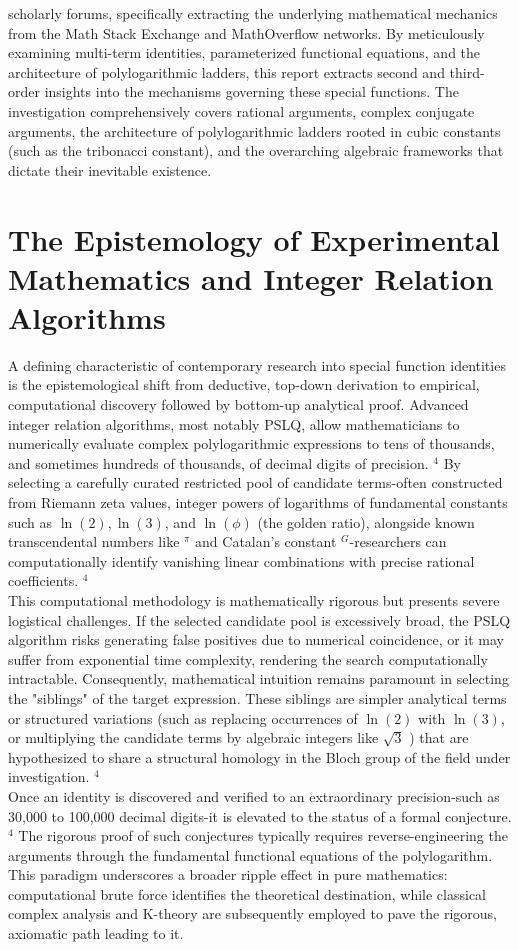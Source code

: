 \documentclass[10pt]{article}
\begin{document}
scholarly forums, specifically extracting the underlying mathematical mechanics from the Math Stack Exchange and MathOverflow networks. By meticulously examining multi-term identities, parameterized functional equations, and the architecture of polylogarithmic ladders, this report extracts second and third-order insights into the mechanisms governing these special functions. The investigation comprehensively covers rational arguments, complex conjugate arguments, the architecture of polylogarithmic ladders rooted in cubic constants (such as the tribonacci constant), and the overarching algebraic frameworks that dictate their inevitable existence.

\section*{The Epistemology of Experimental Mathematics and Integer Relation Algorithms}
A defining characteristic of contemporary research into special function identities is the epistemological shift from deductive, top-down derivation to empirical, computational discovery followed by bottom-up analytical proof. Advanced integer relation algorithms, most notably PSLQ, allow mathematicians to numerically evaluate complex polylogarithmic expressions to tens of thousands, and sometimes hundreds of thousands, of decimal digits of precision. ${ }^{4}$ By selecting a carefully curated restricted pool of candidate terms-often constructed from Riemann zeta values, integer powers of logarithms of fundamental constants such as $\ln (2), \ln (3)$, and $\ln (\phi)$ (the golden ratio), alongside known transcendental numbers like ${ }^{\pi}$ and Catalan's constant ${ }^{G}$-researchers can computationally identify vanishing linear combinations with precise rational coefficients. ${ }^{4}$\\
This computational methodology is mathematically rigorous but presents severe logistical challenges. If the selected candidate pool is excessively broad, the PSLQ algorithm risks generating false positives due to numerical coincidence, or it may suffer from exponential time complexity, rendering the search computationally intractable. Consequently, mathematical intuition remains paramount in selecting the "siblings" of the target expression. These siblings are simpler analytical terms or structured variations (such as replacing occurrences of $\ln (2)$ with $\ln (3)$, or multiplying the candidate terms by algebraic integers like $\sqrt{3}$ ) that are hypothesized to share a structural homology in the Bloch group of the field under investigation. ${ }^{4}$\\
Once an identity is discovered and verified to an extraordinary precision-such as 30,000 to 100,000 decimal digits-it is elevated to the status of a formal conjecture. ${ }^{4}$ The rigorous proof of such conjectures typically requires reverse-engineering the arguments through the fundamental functional equations of the polylogarithm. This paradigm underscores a broader ripple effect in pure mathematics: computational brute force identifies the theoretical destination, while classical complex analysis and K-theory are subsequently employed to pave the rigorous, axiomatic path leading to it.
\end{document}
